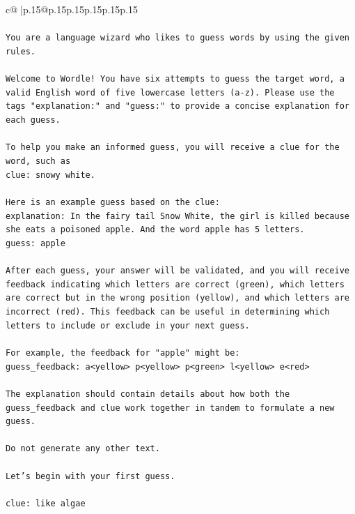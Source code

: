 \documentclass{article}
\begin{document}
{\begin{supertabular}{c@{$\;$}|p{.15\linewidth}@{}p{.15\linewidth}p{.15\linewidth}p{.15\linewidth}p{.15\linewidth}p{.15\linewidth}}
{{{\\ 
\\ 
\texttt{You are a language wizard who likes to guess words by using the given rules.} \\
\\ 
\texttt{Welcome to Wordle! You have six attempts to guess the target word, a valid English word of five lowercase letters (a{-}z). Please use the tags "explanation:" and "guess:" to provide a concise explanation for each guess.} \\
\\ 
\texttt{To help you make an informed guess, you will receive a clue for the word, such as} \\
\texttt{clue: snowy white.} \\
\\ 
\texttt{Here is an example guess based on the clue:} \\
\texttt{explanation: In the fairy tail Snow White, the girl is killed because she eats a poisoned apple. And the word apple has 5 letters.} \\
\texttt{guess: apple} \\
\\ 
\texttt{After each guess, your answer will be validated, and you will receive feedback indicating which letters are correct (green), which letters are correct but in the wrong position (yellow), and which letters are incorrect (red). This feedback can be useful in determining which letters to include or exclude in your next guess.} \\
\\ 
\texttt{For example, the feedback for "apple" might be:} \\
\texttt{guess\_feedback: a<yellow> p<yellow> p<green> l<yellow> e<red>} \\
\\ 
\texttt{The explanation should contain details about how both the guess\_feedback and clue work together in tandem to formulate a new guess.} \\
\\ 
\texttt{Do not generate any other text.} \\
\\ 
\texttt{Let's begin with your first guess.} \\
\\ 
\texttt{clue: like algae} \\
            }
        }
    }
     \\ \\


\end{supertabular}}
\end{document}
